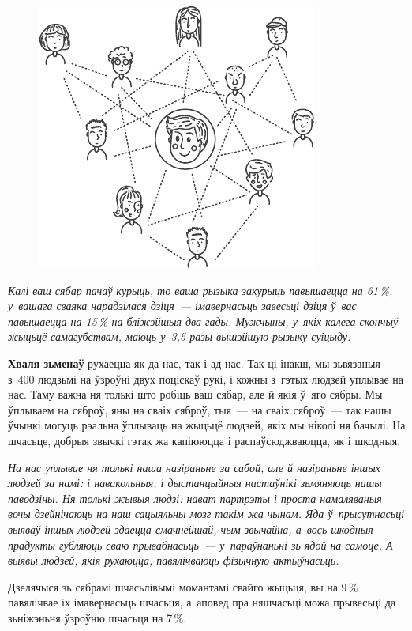 \begin{figure}[htb!]
  \centering
  \includegraphics[scale=1.2]{willpower/ch10/7.pdf}
\end{figure}

\emph{Калі ваш сябар пачаў курыць, то ваша рызыка закурыць павышаецца на 61\,\%, у~вашага сваяка нарадзілася дзіця~--- імавернасьць завесьці дзіця ў~вас павышаецца на 15\,\% на бліжэйшыя два гады. Мужчыны, у~якіх калега скончыў жыцьцё самагубствам, маюць у~3,5 разы вышэйшую рызыку суіцыду.}

\textbf{Хваля зьменаў} рухаецца як да нас, так і ад нас. Так ці інакш, мы зьвязаныя з~400 людзьмі на ўзроўні двух поціскаў рукі, і кожны з~гэтых людзей уплывае на нас. Таму важна ня толькі што робіць ваш сябар, але й якія ў~яго сябры. Мы ўплываем на сяброў, яны на сваіх сяброў, тыя~--- на сваіх сяброў~--- так нашы ўчынкі могуць рэальна ўплываць на жыцьцё людзей, якіх мы ніколі ня бачылі. На шчасьце, добрыя звычкі гэтак жа капіююцца і распаўсюджваюцца, як і шкодныя.

\emph{На нас уплывае ня толькі наша назіраньне за сабой, але й назіраньне іншых людзей за намі: і навакольныя, і дыстанцыйныя настаўнікі зьмяняюць нашы паводзіны. Ня толькі жывыя людзі: нават партрэты і проста намаляваныя вочы дзейнічаюць на наш сацыяльны мозг такім жа чынам. Яда ў~прысутнасьці выяваў іншых людзей здаецца смачнейшай, чым звычайна, а~вось шкодныя прадукты губляюць сваю прывабнасьць~--- у~параўнаньні зь ядой на самоце. А выявы людзей, якія рухаюцца, павялічваюць фізычную актыўнасьць.}

Дзелячыся зь сябрамі шчасьлівымі момантамі свайго жыцьця, вы на 9\,\% павялічвае іх імавернасьць шчасьця, а~аповед пра няшчасьці можа прывесьці да зьніжэньня ўзроўню шчасьця на 7\,\%.

